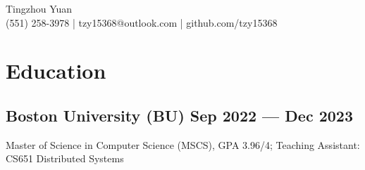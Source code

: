 \documentclass[a4,12pt]{article}
\newcommand{\hskills}[1]{
\textbf{\bfseries #1} }
\begin{document}
 
\vspace{-0.5cm}
\begin{center}
    \begin{minipage}[b]{0.7\textwidth}
            \centering
            {\huge Tingzhou Yuan} \\ %
            \vspace{0.1cm}
           (551) 258-3978  | tzy15368@outlook.com | github.com/tzy15368
    \end{minipage}%
    
\vspace{-0.35cm} 
\end{center}
\vspace{-1cm}

\section{\textbf{Education}}
\vspace{-0.2cm}
\subsection*{Boston University (BU)\hfill \textbf{ Sep 2022 --- Dec 2023 }}
Master of Science in Computer Science (MSCS), GPA 3.96/4; Teaching Assistant: CS651 Distributed Systems\\
\end{document}
